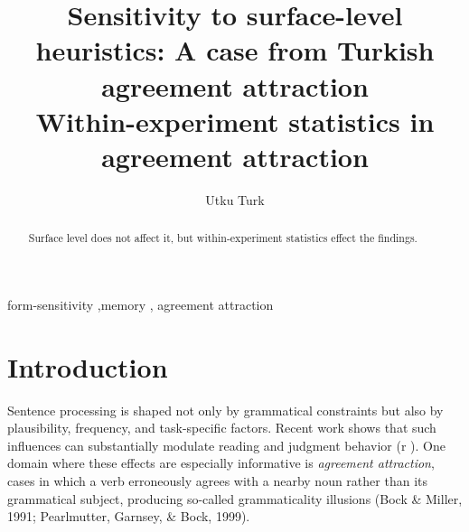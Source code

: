 \documentclass[
  authoryear,
  preprint]{elsarticle}
\begin{document}
\begin{frontmatter}
\title{Sensitivity to surface-level heuristics: A case from Turkish
agreement attraction \\\large{Within-experiment statistics in agreement
attraction} }
\author[1]{Utku Turk%
%
}



        
\begin{abstract}
Surface level does not affect it, but within-experiment statistics
effect the findings.
\end{abstract}





\begin{keyword}
    form-sensitivity \sep memory \sep 
    agreement attraction
\end{keyword}
\end{frontmatter}
    

\section{Introduction}\label{introduction}

Sentence processing is shaped not only by grammatical constraints but
also by plausibility, frequency, and task-specific factors. Recent work
shows that such influences can substantially modulate reading and
judgment behavior (r
\citep{LauraMalsbug24, ArehalliWittenberg2021, HammerlyEtAl2019, LogacevVasishth2016}).
One domain where these effects are especially informative is
\emph{agreement attraction}, cases in which a verb erroneously agrees
with a nearby noun rather than its grammatical subject, producing
so-called grammaticality illusions (Bock \& Miller, 1991; Pearlmutter,
Garnsey, \& Bock, 1999).

\begin{exe}
\end{exe}
\end{document}
